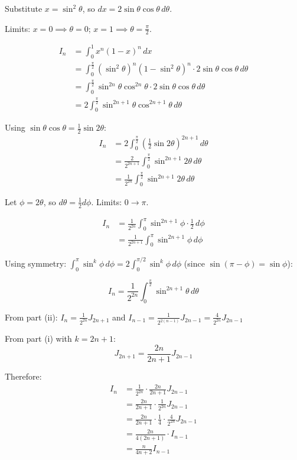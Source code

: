 \begin{solution}[Part (ii)]
Substitute $x = \sin^2 \theta$, so $dx = 2\sin\theta\cos\theta \, d\theta$.

Limits: $x=0 \implies \theta=0$; $x=1 \implies \theta=\frac{\pi}{2}$.

\begin{align*}
I_n &= \int_{0}^{1} x^n(1-x)^n \, dx \\
&= \int_{0}^{\frac{\pi}{2}} (\sin^2\theta)^n (1-\sin^2\theta)^n \cdot 2\sin\theta\cos\theta \, d\theta \\
&= \int_{0}^{\frac{\pi}{2}} \sin^{2n}\theta \cos^{2n}\theta \cdot 2\sin\theta\cos\theta \, d\theta \\
&= 2 \int_{0}^{\frac{\pi}{2}} \sin^{2n+1}\theta\cos^{2n+1}\theta \, d\theta
\end{align*}

Using $\sin\theta\cos\theta = \frac{1}{2}\sin 2\theta$:
\begin{align*}
I_n &= 2 \int_{0}^{\frac{\pi}{2}} \left( \frac{1}{2}\sin 2\theta \right)^{2n+1} \, d\theta \\
&= \frac{2}{2^{2n+1}} \int_{0}^{\frac{\pi}{2}} \sin^{2n+1} 2\theta \, d\theta \\
&= \frac{1}{2^{2n}} \int_{0}^{\frac{\pi}{2}} \sin^{2n+1} 2\theta \, d\theta
\end{align*}

Let $\phi = 2\theta$, so $d\theta = \frac{1}{2}d\phi$. Limits: $0 \to \pi$.

\begin{align*}
I_n &= \frac{1}{2^{2n}} \int_{0}^{\pi} \sin^{2n+1} \phi \cdot \frac{1}{2} \, d\phi \\
&= \frac{1}{2^{2n+1}} \int_{0}^{\pi} \sin^{2n+1} \phi \, d\phi
\end{align*}

Using symmetry: $\int_{0}^{\pi} \sin^{k} \phi \, d\phi = 2\int_{0}^{\pi/2} \sin^{k} \phi \, d\phi$ (since $\sin(\pi-\phi) = \sin\phi$):

\[
\boxed{I_n = \frac{1}{2^{2n}} \int_{0}^{\frac{\pi}{2}} \sin^{2n+1} \theta \, d\theta}
\]
\end{solution}

\begin{solution}

From part (ii): $I_n = \frac{1}{2^{2n}} J_{2n+1}$ and $I_{n-1} = \frac{1}{2^{2(n-1)}} J_{2n-1} = \frac{4}{2^{2n}} J_{2n-1}$

From part (i) with $k = 2n+1$:
\[
J_{2n+1} = \frac{2n}{2n+1} J_{2n-1}
\]

Therefore:
\begin{align*}
I_n &= \frac{1}{2^{2n}} \cdot \frac{2n}{2n+1} J_{2n-1} \\
&= \frac{2n}{2n+1} \cdot \frac{1}{2^{2n}} J_{2n-1} \\
&= \frac{2n}{2n+1} \cdot \frac{1}{4} \cdot \frac{4}{2^{2n}} J_{2n-1} \\
&= \frac{2n}{4(2n+1)} \cdot I_{n-1} \\
&= \boxed{\frac{n}{4n+2} I_{n-1}}
\end{align*}
\end{solution}

